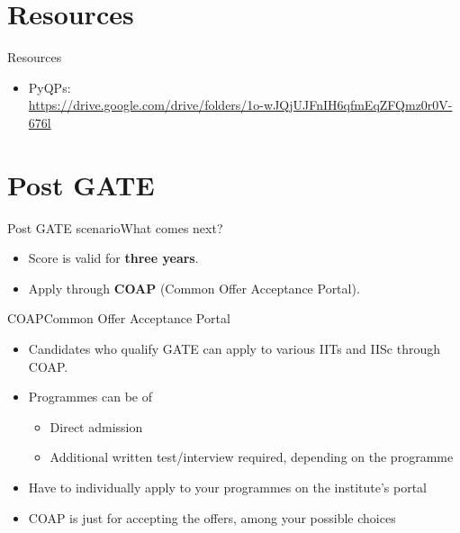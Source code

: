 \documentclass[handout]{beamer}
\begin{document}
\section{Resources}
\begin{frame}{Resources}
    \begin{itemize}
        \item PyQPs: \\
              \scriptsize{\url{https://drive.google.com/drive/folders/1o-wJQjUJFnIH6qfmEqZFQmz0r0V-676l}}
    \end{itemize}
\end{frame}

\section{Post GATE}
\begin{frame}{Post GATE scenario}{What comes next?}
    \begin{itemize}
        \item Score is valid for \textbf{three years}.
        \item Apply through \textbf{COAP} (Common Offer Acceptance Portal).
    \end{itemize}
\end{frame}

\begin{frame}{COAP}{Common Offer Acceptance Portal}
    \begin{itemize}
        \item Candidates who qualify GATE can apply to various IITs and IISc through COAP.
        \item Programmes can be of
              \begin{itemize}
                  \item Direct admission
                  \item Additional written test/interview required, depending on the programme
              \end{itemize}
        \item Have to individually apply to your programmes on the institute's portal
        \item COAP is just for accepting the offers, among your possible choices
    \end{itemize}
\end{frame}
\end{document}
